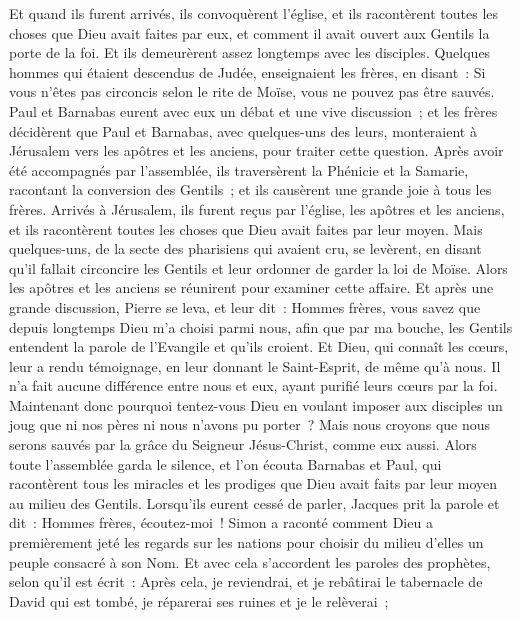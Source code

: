 \begin{multicols}{2}
Et quand ils furent arrivés, ils convoquèrent l'église, et ils racontèrent toutes les choses que Dieu avait faites par eux, et comment il avait ouvert aux Gentils la porte de la foi.
Et ils demeurèrent assez longtemps avec les disciples.
\VerseOne{}Quelques hommes qui étaient descendus de Judée, enseignaient les frères, en disant~: Si vous n'êtes pas circoncis selon le rite de Moïse, vous ne pouvez pas être sauvés.
Paul et Barnabas eurent avec eux un débat et une vive discussion~; et les frères décidèrent que Paul et Barnabas, avec quelques-uns des leurs, monteraient à Jérusalem vers les apôtres et les anciens, pour traiter cette question.
Après avoir été accompagnés par l'assemblée, ils traversèrent la Phénicie et la Samarie, racontant la conversion des Gentils~; et ils causèrent une grande joie à tous les frères.
Arrivés à Jérusalem, ils furent reçus par l'église, les apôtres et les anciens, et ils racontèrent toutes les choses que Dieu avait faites par leur moyen.
Mais quelques-uns, de la secte des pharisiens qui avaient cru, se levèrent, en disant qu'il fallait circoncire les Gentils et leur ordonner de garder la loi de Moïse.
Alors les apôtres et les anciens se réunirent pour examiner cette affaire.
Et après une grande discussion, Pierre se leva, et leur dit~: Hommes frères, vous savez que depuis longtemps Dieu m'a choisi parmi nous, afin que par ma bouche, les Gentils entendent la parole de l'Evangile et qu'ils croient.
Et Dieu, qui connaît les cœurs, leur a rendu témoignage, en leur donnant le Saint-Esprit, de même qu'à nous.
Il n'a fait aucune différence entre nous et eux, ayant purifié leurs cœurs par la foi.
Maintenant donc pourquoi tentez-vous Dieu en voulant imposer aux disciples un joug que ni nos pères ni nous n'avons pu porter~?
Mais nous croyons que nous serons sauvés par la grâce du Seigneur Jésus-Christ, comme eux aussi.
Alors toute l'assemblée garda le silence, et l'on écouta Barnabas et Paul, qui racontèrent tous les miracles et les prodiges que Dieu avait faits par leur moyen au milieu des Gentils.
Lorsqu'ils eurent cessé de parler, Jacques prit la parole et dit~: Hommes frères, écoutez-moi~!
Simon a raconté comment Dieu a premièrement jeté les regards sur les nations pour choisir du milieu d'elles un peuple consacré à son Nom.
Et avec cela s'accordent les paroles des prophètes, selon qu'il est écrit~:
Après cela, je reviendrai, et je rebâtirai le tabernacle de David qui est tombé, je réparerai ses ruines et je le relèverai~;

\end{multicols}
